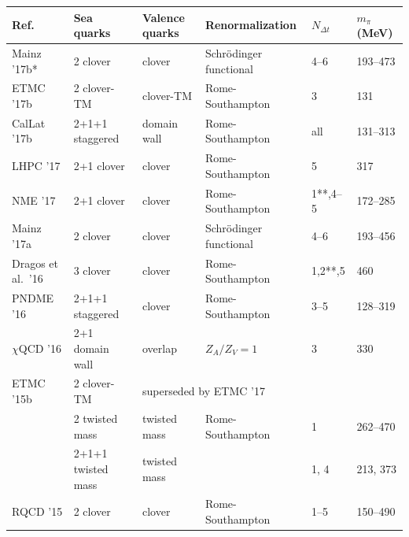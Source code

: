 \begin{table}[!t]
\renewcommand{\arraystretch}{1.2} 
\centering
\footnotesize
\begin{threeparttable}
\begin{tabular}{llllll}
\toprule
Ref. & Sea quarks & Valence quarks & Renormalization & 
$N_{\Delta t}$ & $m_\pi$ (MeV)\\
\midrule
  Mainz '17b* \cite{Capitani:2017qpc} &
  2 clover & clover & Schr\"odinger functional & 4--6 & 193--473\\

  ETMC '17b \cite{Alexandrou:2017hac} &
  2 clover-TM & clover-TM & Rome-Southampton & 3 & 131\\

  CalLat '17b \cite{Berkowitz:2017gql} &
  2+1+1 staggered & domain wall & Rome-Southampton & all & 131--313 \\

  LHPC '17 \cite{Green:2017keo} &
  2+1 clover & clover & Rome-Southampton & 5 & 317 \\

  NME '17 \cite{Yoon:2016jzj} &
  2+1 clover & clover & Rome-Southampton & 1**,4--5 & 172--285 \\

  Mainz '17a \cite{vonHippel:2016wid} &
  2 clover & clover & Schr\"odinger functional & 4--6 & 193--456\\

  Dragos et al.\ '16 \cite{Dragos:2016rtx} &
  3 clover & clover & Rome-Southampton & 1,2**,5 & 460 \\

  PNDME '16 \cite{Bhattacharya:2016zcn} &
  2+1+1 staggered & clover & Rome-Southampton & 3--5 & 128--319\\

  $\chi$QCD '16 \cite{Yang:2015zja} &
  2+1 domain wall & overlap & $Z_A/Z_V=1$ & 3 & 330 \\

  ETMC '15b \cite{Abdel-Rehim:2015owa} &
    2 clover-TM & \multicolumn{4}{l}{superseded by ETMC '17} \\
  & 2 twisted mass & twisted mass & Rome-Southampton & 1 & 262--470\\
  & 2+1+1 twisted mass & twisted mass & & 1, 4 & 213, 373\\

  RQCD '15 \cite{Bali:2014nma} &
  2 clover & clover & Rome-Southampton & 1--5 & 150--490\\


\end{tabular}
\end{threeparttable}
\end{table}
